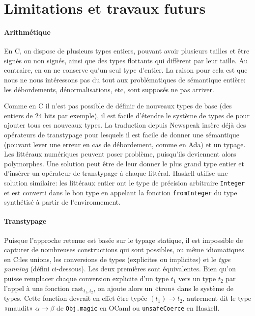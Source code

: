

\section{Limitations et travaux futurs}

\paragraph{Arithmétique}

En C, on dispose de plusieurs types entiers, pouvant avoir plusieurs tailles et
être signés ou non signés, ainsi que des types flottants qui diffèrent par leur
taille. Au contraire, en \langname{} on ne conserve qu'un seul type d'entier. La
raison pour cela est que nous ne nous intéressons pas du tout aux problématiques
de sémantique entière: les débordements, dénormalisations, etc, sont supposés ne
pas arriver.

Comme en C il n'est pas possible de définir de nouveaux types de base (des
entiers de 24 bits par exemple), il est facile d'étendre le système de types de
\langname{} pour ajouter tous ces nouveaux types. La traduction depuis Newspeak
insère déjà des opérateurs de transtypage pour lesquels il est facile de donner
une sémantique (pouvant lever une erreur en cas de débordement, comme en Ada) et
un typage. Les littéraux numériques peuvent poser problème, puisqu'ils
deviennent alors polymorphes. Une solution peut être de leur donner le plus
grand type entier et d'insérer un opérateur de transtypage à chaque littéral.
Haskell utilise une solution similaire: les littéraux entier ont le type de
précision arbitraire \texttt{Integer} et est converti dans le bon type en
appelant la fonction \texttt{fromInteger} du type synthétisé à partir de
l'environnement.

\paragraph{Transtypage}

Puisque l'approche retenue est basée sur le typage statique, il est impossible
de capturer de nombreuses constructions qui sont possibles, ou même idiomatiques
en C:\@ les unions, les conversions de types (explicites ou implicites) et le
\emph{type punning} (défini ci-dessous). Les deux premières sont équivalentes.
Bien qu'on puisse remplacer chaque conversion explicite d'un type $t_1$ vers un
type $t_2$ par l'appel à une fonction $\mathrm{cast}_{t_1,t_2}$, on ajoute alors
un «trou» dans le système de types. Cette fonction devrait en effet être typée
$(t_1) → t_2$, autrement dit le type «maudit» $α → β$ de \texttt{Obj.magic} en
OCaml ou \texttt{unsafeCoerce} en Haskell.

